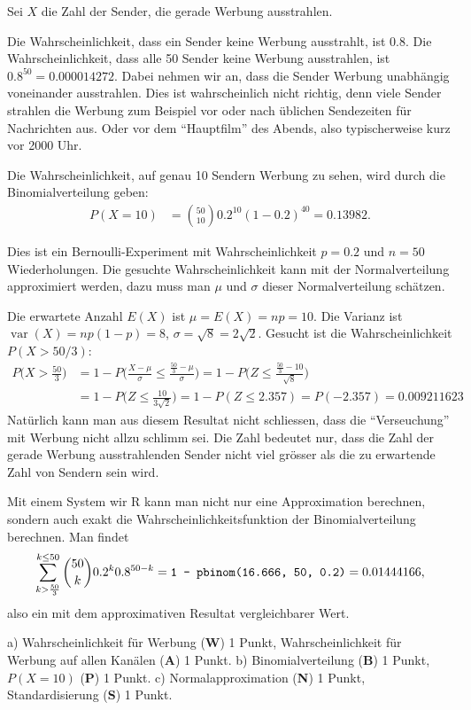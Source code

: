 \begin{loesung}
Sei $X$ die Zahl der Sender, die gerade Werbung ausstrahlen.
\begin{teilaufgaben}
\item
Die Wahrscheinlichkeit, dass ein Sender keine Werbung ausstrahlt, ist
$0.8$. Die Wahrscheinlichkeit, dass alle 50 Sender keine Werbung
ausstrahlen, ist $0.8^{50}=0.000014272$.
Dabei nehmen wir an, dass die Sender Werbung unabhängig voneinander 
ausstrahlen. Dies ist wahrscheinlich nicht richtig, denn viele Sender
strahlen die Werbung zum Beispiel vor oder nach üblichen Sendezeiten
für Nachrichten aus. Oder vor dem ``Hauptfilm'' des Abends, also
typischerweise kurz vor 2000 Uhr.
\item
Die Wahrscheinlichkeit, auf genau 10 Sendern Werbung zu sehen, wird durch
die Binomialverteilung geben: 
\begin{align*}
P(X=10)&=\binom{50}{10}0.2^{10}(1-0.2)^{40}=0.13982.
\end{align*}
\item
Dies ist ein Bernoulli-Experiment mit Wahrscheinlichkeit $p=0.2$
und $n=50$ Wiederholungen. Die gesuchte Wahrscheinlichkeit kann mit
der Normalverteilung approximiert werden, dazu muss man $\mu$ und
$\sigma$ dieser Normalverteilung schätzen.

Die erwartete Anzahl $E(X)$ ist $\mu=E(X)=np=10$. Die Varianz ist
$\operatorname{var}(X)=np(1-p)=8$, $\sigma=\sqrt{8}=2\sqrt{2}$.
Gesucht ist die Wahrscheinlichkeit $P(X>50/3)$:
\begin{align*}
P\biggl(
X>\frac{50}3
\biggr)
&=
1-P\biggl(
\frac{X-\mu}{\sigma}\le \frac{\frac{50}3-\mu}{\sigma}
\biggr)
=
1-P\biggl(
Z\le \frac{\frac{50}3-10}{\sqrt{8}}
\biggr)
\\
&=
1-P\biggl(
Z\le \frac{10}{3\sqrt{2}}
\biggr)
=
1-P(Z\le 2.357) = P(-2.357) = 0.009211623
\end{align*}
Natürlich kann man aus diesem Resultat nicht schliessen, dass 
die ``Verseuchung'' mit Werbung nicht allzu schlimm sei.
Die Zahl bedeutet nur, dass die Zahl der gerade Werbung ausstrahlenden
Sender nicht viel grösser als die zu erwartende Zahl von Sendern
sein wird.

Mit einem System wir R kann man nicht nur eine Approximation berechnen,
sondern auch exakt die Wahrscheinlichkeitsfunktion der Binomialverteilung
berechnen. Man findet
\[
\sum_{k>\frac{50}3}^{k\le 50}\binom{50}{k}0.2^k0.8^{50-k}
=
\text{\tt 1 - pbinom(16.666, 50, 0.2)}
=0.01444166,
\]
also ein mit dem approximativen Resultat vergleichbarer Wert.
\qedhere
\end{teilaufgaben}
\end{loesung}

\begin{bewertung}
a) Wahrscheinlichkeit für Werbung ({\bf W}) 1 Punkt,
Wahrscheinlichkeit für Werbung auf allen Kanälen ({\bf A}) 1 Punkt.
b) Binomialverteilung ({\bf B}) 1 Punkt, $P(X=10)$ ({\bf P}) 1 Punkt.
c) Normalapproximation ({\bf N}) 1 Punkt, Standardisierung ({\bf S}) 1 Punkt.
\end{bewertung}
